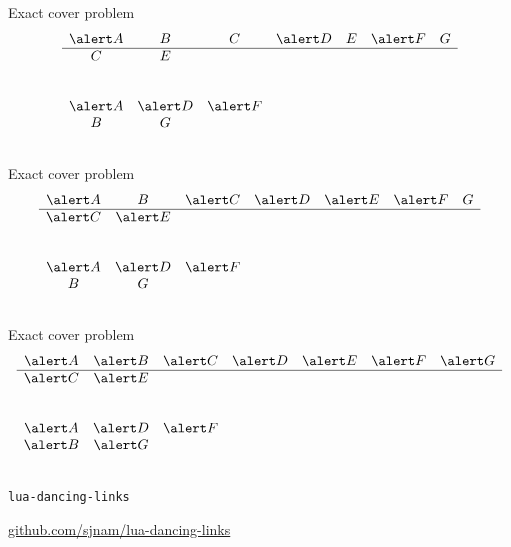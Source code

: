 \documentclass{beamer}
\begin{document}
%
\begin{frame}{Exact cover problem} 
  $$
  \begin{array}{ccccccc}
    \alert A & B & C & \alert D & E & \alert F & G\\
    \hline
    C & E &&&&&\\
    &&&&&&\\
    &&&&&&\\
    \alert A & \alert D & \alert F &&&&\\
    B & G &&&&&\\
    &&&&&&
  \end{array}
  $$
\end{frame}

%
\begin{frame}{Exact cover problem} 
  $$
  \begin{array}{ccccccc}
    \alert A & B & \alert C & \alert D & \alert E & \alert F & G\\
    \hline
    \alert C & \alert E &&&&&\\
    &&&&&&\\
    &&&&&&\\
    \alert A & \alert D & \alert F &&&&\\
    B & G &&&&&\\
    &&&&&&
  \end{array}
  $$
\end{frame}

%
\begin{frame}{Exact cover problem} 
  $$
  \begin{array}{ccccccc}
    \alert A & \alert B & \alert C & \alert D
    & \alert E & \alert F & \alert G\\
    \hline
    \alert C & \alert E &&&&&\\
    &&&&&&\\
    &&&&&&\\
    \alert A & \alert D & \alert F &&&&\\
    \alert B & \alert G &&&&&\\
    &&&&&&
  \end{array}
  $$
\end{frame}

%

%
\begin{frame}{\texttt{lua-dancing-links}}
\vfill
\begin{center}
\Large
  \href{https://github.com/sjnam/lua-dancing-links}
    {github.com/sjnam/lua-dancing-links}
\end{center}
\vfill
\end{frame}
\end{document}
